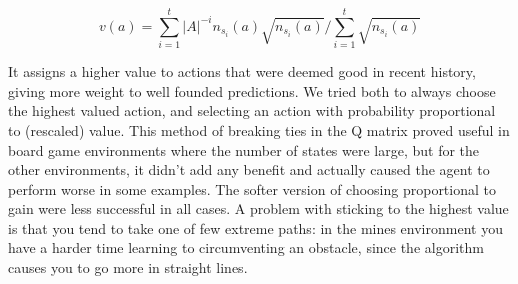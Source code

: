 \begin{equation}
    v(a) = \sum_{i=1}^{t} \vert{A}\vert^{-i} n_{s_i}(a)
    \sqrt{n_{s_i}(a)}\Big/\sum_{i=1}^{t} \sqrt{n_{s_i}(a)}
\end{equation}

It assigns a higher value to actions that were deemed good in recent history,
giving more weight to well founded predictions. We tried both to always choose
the highest valued action, and selecting an action with probability proportional
to (rescaled) value. This method of breaking ties in the Q matrix proved useful
in board game environments  where the number of states were large, but for the
other environments, it didn't add any benefit and actually caused the agent to
perform worse in some examples. The softer version of choosing proportional to
gain were less successful in all cases. A problem with sticking to the highest
value is that you tend to take one of few extreme paths: in the mines
environment you have a harder time learning to circumventing an obstacle, since
the algorithm causes you to go more in straight lines.
